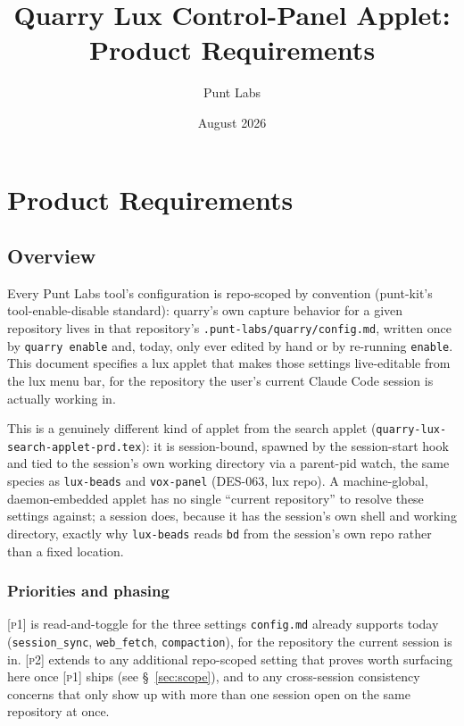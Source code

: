 \documentclass[a4paper,11pt]{report}
\newcommand{\pone}{\textsc{[p1]}}
\newcommand{\ptwo}{\textsc{[p2]}}
\begin{document}
\title{Quarry Lux Control-Panel Applet: Product Requirements}
\author{Punt Labs}
\date{August 2026}
\maketitle
\tableofcontents

\chapter{Product Requirements}

\section{Overview}

Every Punt Labs tool's configuration is repo-scoped by convention
(punt-kit's tool-enable-disable standard): quarry's own capture behavior
for a given repository lives in that repository's
\texttt{.punt-labs/quarry/config.md}, written once by \texttt{quarry
enable} and, today, only ever edited by hand or by re-running
\texttt{enable}. This document specifies a lux applet that makes those
settings live-editable from the lux menu bar, for the repository the
user's current Claude Code session is actually working in.

This is a genuinely different kind of applet from the search applet
(\texttt{quarry-lux-search-applet-prd.tex}): it is session-bound, spawned
by the session-start hook and tied to the session's own working directory
via a parent-pid watch, the same species as \texttt{lux-beads} and
\texttt{vox-panel} (DES-063, lux repo). A machine-global,
daemon-embedded applet has no single ``current repository'' to resolve
these settings against; a session does, because it has the session's own
shell and working directory, exactly why \texttt{lux-beads} reads
\texttt{bd} from the session's own repo rather than a fixed location.

\subsection{Priorities and phasing}

\pone{} is read-and-toggle for the three settings
\texttt{config.md} already supports today (\texttt{session\_sync},
\texttt{web\_fetch}, \texttt{compaction}), for the repository the current
session is in. \ptwo{} extends to any additional repo-scoped setting that
proves worth surfacing here once \pone{} ships (see \S~\ref{sec:scope}),
and to any cross-session consistency concerns that only show up with more
than one session open on the same repository at once.
\end{document}
